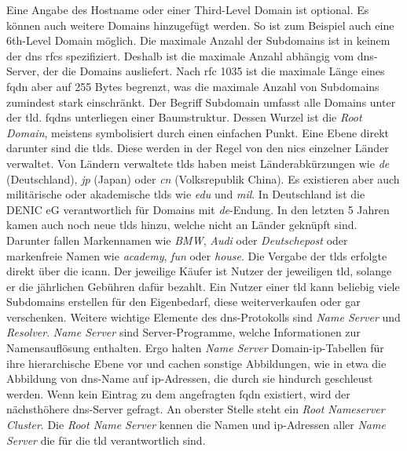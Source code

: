 \documentclass[titlepage]{report}
\begin{document}
Eine Angabe des Hostname oder einer Third-Level
Domain ist optional. Es können auch weitere Domains hinzugefügt werden.
So ist zum Beispiel auch eine 6th-Level Domain möglich. Die maximale Anzahl der
Subdomains ist in keinem der \gls{dns} \glspl{rfc} spezifiziert. Deshalb
ist die maximale Anzahl abhängig vom \gls{dns}\hyp{}Server, der die
Domains ausliefert. Nach \gls{rfc} 1035 ist die maximale Länge eines
\gls{fqdn} aber auf 255 Bytes begrenzt\cite[siehe Section
2.3.4]{RFC1035}, was die maximale Anzahl von Subdomains zumindest stark
einschränkt. Der Begriff Subdomain umfasst alle Domains unter der
\gls{tld}. \glspl{fqdn} unterliegen einer Baumstruktur. Dessen Wurzel ist die
\emph{Root Domain}, meistens symbolisiert durch einen einfachen Punkt.
Eine Ebene direkt darunter sind die \glspl{tld}. Diese
werden in der Regel von den \glspl{nic} einzelner Länder verwaltet. Von
Ländern verwaltete \glspl{tld} haben meist Länderabkürzungen wie
\emph{de} (Deutschland), \emph{jp} (Japan) oder \emph{cn} (Volksrepublik
China). Es existieren aber auch militärische oder akademische
\glspl{tld} wie \emph{edu} und \emph{mil}. In Deutschland ist die DENIC eG
verantwortlich für Domains mit \emph{de}\hyp{}Endung.
In den letzten 5 Jahren kamen auch noch neue \glspl{tld} hinzu, welche
nicht an Länder geknüpft sind. Darunter fallen Markennamen wie
\emph{BMW}, \emph{Audi} oder \emph{Deutschepost} oder markenfreie Namen
wie \emph{academy}, \emph{fun} oder \emph{house}\cite{NEWTLDLIST}. Die
Vergabe der \glspl{tld} erfolgte direkt über die \gls{icann}. Der jeweilige
Käufer ist Nutzer der jeweiligen \gls{tld}, solange er die jährlichen
Gebühren dafür bezahlt. Ein Nutzer einer \gls{tld} kann beliebig viele Subdomains erstellen für den
Eigenbedarf, diese weiterverkaufen oder gar verschenken. Weitere
wichtige Elemente des \gls{dns}\hyp{}Protokolls sind \emph{Name Server}
und \emph{Resolver}\cite[siehe Section 2.4]{RFC1034}.
\emph{Name Server} sind Server\hyp{}Programme, welche
Informationen zur Namensauflösung enthalten. Ergo halten \emph{Name
Server} Domain\hyp{}\gls{ip}\hyp{}Tabellen für ihre
hierarchische Ebene vor und cachen sonstige Abbildungen, wie in etwa die
Abbildung von \gls{dns}\hyp{}Name auf \gls{ip}\hyp{}Adressen, die durch sie
hindurch geschleust werden. Wenn kein Eintrag zu dem angefragten \gls{fqdn}
existiert, wird der nächsthöhere \gls{dns}\hyp{}Server gefragt. An
oberster Stelle steht ein \emph{Root Nameserver
Cluster}\cite{ROOTNAMESERVER}. Die \emph{Root
Name Server} kennen die Namen und \gls{ip}\hyp{}Adressen aller
\emph{Name Server} die für die \gls{tld} verantwortlich sind.
\end{document}
